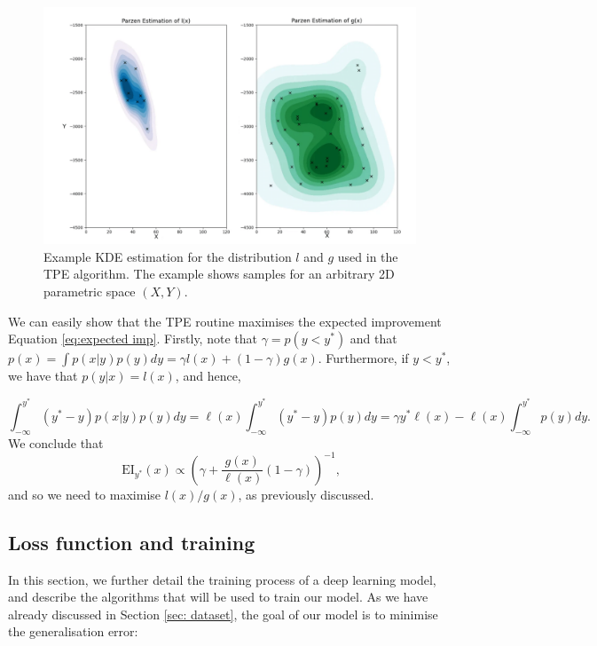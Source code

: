 \begin{figure}[h!] 
    \centering
    \includegraphics[width=0.99\textwidth]{img/ML/Parzen.png}
    \caption{Example KDE estimation for the distribution $l$ and $g$ used in the TPE algorithm. The example shows samples for an arbitrary 2D parametric space $(X, Y)$.}
    \label{fig:ML TPE}
\end{figure}
We can easily show that the TPE routine maximises the expected improvement Equation \ref{eq:expected imp}.
Firstly, note that $\gamma=p(y<y^*)$ and that $p(x)=\int p(x|y)p(y)dy=\gamma l(x) +(1-\gamma) g(x)$. Furthermore, if $y<y^*$, we have that 
$p(y|x)=l(x)$, and hence,

\begin{equation}
    \int_{-\infty}^{y^*}(y^*-y)p(x|y)p(y)dy=\ell(x)\int_{-\infty}^{y^*}(y^*-y)p(y)dy=\gamma y^*\ell(x)-\ell(x)\int_{-\infty}^{y^*}p(y)dy.
\end{equation}
We conclude that 
\begin{equation}
    \text{EI}_{y^*}(x)\propto \left(\gamma+\frac{g(x)}{\ell(x)}(1-\gamma)\right)^{-1},
\end{equation}
and so we need to maximise $l(x)/g(x)$, as previously discussed.




\subsection{Loss function and training}
In this section, we further detail the training process of a deep learning model, and describe the algorithms that will be used to train our model.
As we have already discussed in Section \ref{sec: dataset}, the goal of our model is to minimise the generalisation error:

